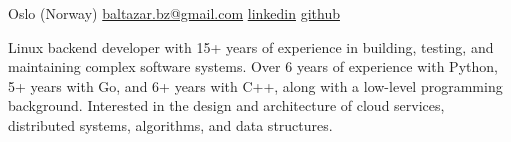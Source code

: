 \documentclass[unicode, 10pt, a4paper, oneside, fleqn]{article}
\begin{document}
\sloppy  %


\nobreakvspace{0.3em}  %

Oslo (Norway)
\sbull
\href{mailto:baltazar.bz@gmail.com}{baltazar.bz\mbox{}@\mbox{}gmail.com}\sbull
\href{http://linkedin.com/pub/yuri-bochkarev/21/3a9/555}{linkedin}
\sbull
\href{https://github.com/balta2ar}{github}



\noindent
Linux backend developer with 15+ years of experience in building,
testing, and maintaining complex software systems. Over 6 years of experience
with Python, 5+ years with Go, and 6+ years with C++, along with a
low-level programming background. Interested in the design and architecture of cloud
services, distributed systems, algorithms, and data structures.




\end{document}
